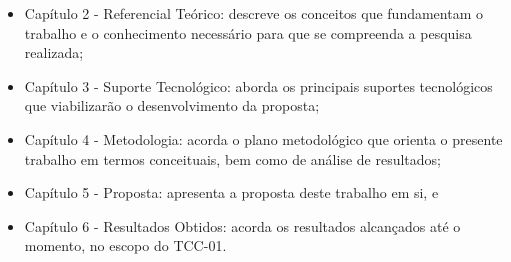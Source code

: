 \begin{itemize}


        \item Capítulo 2 - Referencial Teórico: descreve os conceitos que fundamentam o trabalho e o conhecimento necessário para que se compreenda a pesquisa realizada;
        
        \item Capítulo 3 - Suporte Tecnológico: aborda os principais suportes tecnológicos que viabilizarão o desenvolvimento da proposta;
        
        \item Capítulo 4 - Metodologia: acorda o plano metodológico que orienta o presente trabalho em termos conceituais, bem como de análise de resultados;

        \item Capítulo 5 - Proposta: apresenta a proposta deste trabalho em si, e

        \item Capítulo 6 - Resultados Obtidos: acorda os resultados alcançados até o momento, no escopo do TCC-01.
          
\end{itemize}
